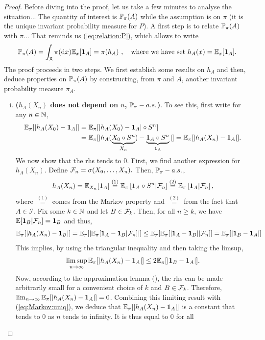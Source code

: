 \documentclass[english,graybox,envcountchap,envcountsame,sectrefs,shortlabels]{svmono}
\theoremstyle{style}
\newenvironment{svmultproof}{\small \begin{proof}}{\end{proof}}
\begin{document}
\begin{svmultproof}
Before diving into the proof, let us take a few minutes to analyse
the situation... The quantity of interest is $\mathbb{P}_{\pi}(A)$ while
the assumption is on $\pi$ (it is the unique invariant probability
measure for $P$). A first step is to relate $\mathbb{P}_{\pi}(A)$ with
$\pi$... That reminds us (\ref{eq:relation:P}), which allows to
write
\[
\mathbb{P}_{\pi}(A)=\int_{\mathsf{X}}\pi(\mathrm{d} x)\mathbb{E}_{x}[\mathbf{1}_{A}]=\pi(h_{A})\ ,\quad\mbox{where we have set }h_{A}(x)=\mathbb{E}_{x}[\mathbf{1}_{A}].
\]
The proof proceeds in two steps. We first establish some results on
$h_{A}$ and then, deduce properties on $\mathbb{P}_{\pi}(A)$ by constructing,
from $\pi$ and $A$, another invariant probability measure $\pi_{A}$.
\begin{enumerate}[(i)]
\item \textbf{($h_{A}(X_{n})$ does not depend on $n$, $\mathbb{P}_{\pi}-a.s.$)}.
To see this, first write for any $n\in\mathbb{N}$,
\begin{align}
\mathbb{E}_{\pi}[|h_{A}(X_{0})-\mathbf{1}_{A}|] & =\mathbb{E}_{\pi}[|h_{A}(X_{0})-\mathbf{1}_{A}|\circ S^{n}]\label{eq:Markov:uniq}\\
 & =\mathbb{E}_{\pi}[|h_{A}(\underbrace{X_{0}\circ S^{n}}_{X_{n}})-\underbrace{\mathbf{1}_{A}\circ S^{n}}_{\mathbf{1}_{A}}|]=\mathbb{E}_{\pi}[|h_{A}(X_{n})-\mathbf{1}_{A}|].\nonumber
\end{align}
We now show that the rhs tends to $0$. First, we find another expression
for $h_{A}(X_{n})$. Define $\mathcal{F}_{n}=\sigma(X_{0},\ldots,X_{n}).$
Then, $\mathbb{P}_{\pi}-a.s.$,
\[
h_{A}(X_{n})=\mathbb{E}_{X_{n}}[\mathbf{1}_{A}]\stackrel{(1)}{=}\mathbb{E}_{\pi}\left[\mathbf{1}_{A}\circ S^{n}|\mathcal{F}_{n}\right]\stackrel{(2)}{=}\mathbb{E}_{\pi}\left[\mathbf{1}_{A}|\mathcal{F}_{n}\right],
\]
where $\stackrel{(1)}{=}$ comes from the Markov property and $\stackrel{(2)}{=}$
from the fact that $A\in\mathcal{I}$. Fix some $k\in\mathbb{N}$ and let
$B\in\mathcal{F}_{k}$. Then, for all $n\geq k$, we have $\mathbb{E}[\mathbf{1}_{B}|\mathcal{F}_{n}]=\mathbf{1}_{B}$
and thus,
\[
\mathbb{E}_{\pi}[|h_{A}(X_{n})-\mathbf{1}_{B}|]=\mathbb{E}_{\pi}[|\mathbb{E}_{\pi}[\mathbf{1}_{A}-\mathbf{1}_{B}|\mathcal{F}_{n}]|]\leq\mathbb{E}_{\pi}[\mathbb{E}_{\pi}[|\mathbf{1}_{A}-\mathbf{1}_{B}||\mathcal{F}_{n}]]=\mathbb{E}_{\pi}[|\mathbf{1}_{B}-\mathbf{1}_{A}|]
\]
This implies, by using the triangular inequality and then taking the
limsup,
\[
\limsup_{n\to\infty}\mathbb{E}_{\pi}[|h_{A}(X_{n})-\mathbf{1}_{A}|]\leq2\mathbb{E}_{\pi}[|\mathbf{1}_{B}-\mathbf{1}_{A}|].
\]
Now, according to the approximation lemma (), the
rhs can be made arbitrarily small for a convenient choice of $k$
and $B\in\mathcal{F}_{k}$. Therefore, $\lim_{n\to\infty}\mathbb{E}_{\pi}[|h_{A}(X_{n})-\mathbf{1}_{A}|]=0$.
Combining this limiting result with (\ref{eq:Markov:uniq}), we deduce
that $\mathbb{E}_{\pi}[|h_{A}(X_{n})-\mathbf{1}_{A}|]$ is a constant that tends
to $0$ as $n$ tends to infinity. It is thus equal to $0$ for all

\end{enumerate}
\end{svmultproof}
\end{document}
